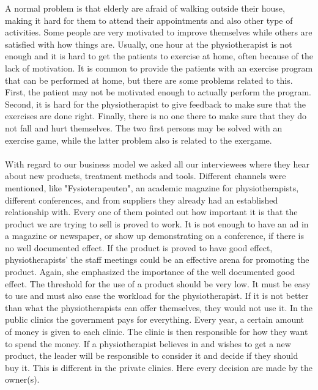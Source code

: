 A normal problem is that elderly are afraid of walking outside their house, making it hard for them to attend their appointments and also other type of activities. Some people are very motivated to improve themselves while others are satisfied with how things are. Usually, one hour at the physiotherapist is not enough and it is hard to get the patients to exercise at home, often because of the lack of motivation. It is common to provide the patients with an exercise program that can be performed at home, but there are some problems related to this. First, the patient may not be motivated enough to actually perform the program. Second, it is hard for the physiotherapist to give feedback to make sure that the exercises are done right. Finally, there is no one there to make sure that they do not fall and hurt themselves. The two first persons may be solved with an exercise game, while the latter problem also is related to the exergame.  \\ \\
With regard to our business model we asked all our interviewees where they hear about new products, treatment methods and tools. Different channels were mentioned, like "Fysioterapeuten", an academic magazine for physiotherapists, different conferences, and from suppliers they already had an established relationship with. Every one of them pointed out how important it is that the product we are trying to sell is proved to work. It is not enough to have an ad in a magazine or newspaper, or show up demonstrating on a conference, if there is no well documented effect. If the product is proved to have good effect, physiotherapists' the staff meetings could be an effective arena for promoting the product. Again, she emphasized the importance of the well documented good effect. The threshold for the use of a product should be very low. It must be easy to use and must also ease the workload for the physiotherapist. If it is not better than what the physiotherapists can offer themselves, they would not use it. In the public clinics the government pays for everything. Every year, a certain amount of money is given to each clinic. The clinic is then responsible for how they want to spend the money. If a physiotherapist believes in and wishes to get a new product, the leader will be responsible to consider it and decide if they should buy it. This is different in the private clinics. Here every decision are made by the owner(s). \\ \\
